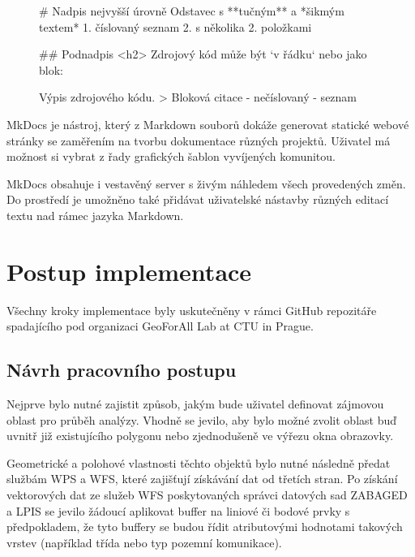 \documentclass[a4paper,oneside,12pt]{book}
\begin{document}
\begin{figure}[H]
\begin{pythoncode}[style=mypython, caption={Ukázka Markdown syntaxe},label={kod:md}]
# Nadpis nejvyšší úrovně
Odstavec s **tučným** a *šikmým textem*
1. číslovaný seznam
2. s několika
2. položkami

## Podnadpis <h2>
Zdrojový kód může být `v řádku` nebo jako blok:

  Výpis zdrojového kódu.
> Bloková citace
- nečíslovaný
- seznam
\end{pythoncode}
\end{figure}

\hspace{10mm} MkDocs je nástroj, který z Markdown souborů dokáže generovat statické webové stránky se zaměřením na tvorbu dokumentace různých projektů. Uživatel má možnost si vybrat z řady grafických šablon vyvíjených komunitou.

\hspace{10mm}MkDocs obsahuje i vestavěný server s živým náhledem všech provedených změn. Do prostředí je umožněno také přidávat uživatelské nástavby různých editací textu nad rámec jazyka Markdown.


\chapter{Postup implementace} \label{implementace}
\hspace{10mm}Všechny kroky implementace byly uskutečněny v rámci GitHub repozitáře spadajícího pod organizaci GeoForAll Lab at CTU in Prague.

\section{Návrh pracovního postupu} \label{workflow}
\hspace{10mm}Nejprve bylo nutné zajistit způsob, jakým bude uživatel definovat zájmovou oblast pro průběh analýzy. Vhodně se jevilo, aby bylo možné zvolit oblast buď uvnitř již existujícího polygonu nebo zjednodušeně ve výřezu okna obrazovky.

\hspace{10mm}Geometrické a polohové vlastnosti těchto objektů bylo nutné následně předat službám WPS a WFS, které zajišťují získávání dat od třetích stran. Po získání vektorových dat ze služeb WFS poskytovaných správci datových sad ZABAGED a LPIS se jevilo žádoucí aplikovat buffer na liniové či bodové prvky s předpokladem, že tyto buffery se budou řídit atributovými hodnotami takových vrstev (například třída nebo typ pozemní komunikace). 
\end{document}
